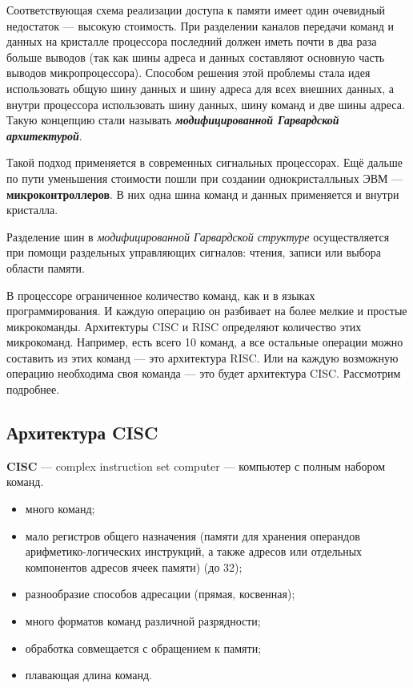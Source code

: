 Соответствующая схема реализации доступа к памяти имеет один очевидный недостаток --- высокую стоимость.
При разделении каналов передачи команд и данных на кристалле процессора последний должен иметь почти в два раза больше выводов (так как шины адреса и данных составляют основную часть выводов микропроцессора).
Способом решения этой проблемы стала идея использовать общую шину данных и шину адреса для всех внешних данных, а внутри процессора использовать шину данных, шину команд и две шины адреса.
Такую концепцию стали называть \textbf{\emph{модифицированной Гарвардской архитектурой}}.

Такой подход применяется в современных сигнальных процессорах.
Ещё дальше по пути уменьшения стоимости пошли при создании однокристалльных ЭВМ --- \textbf{микроконтроллеров}.
В них одна шина команд и данных применяется и внутри кристалла.

Разделение шин в \emph{модифицированной Гарвардской структуре} осуществляется при помощи раздельных управляющих сигналов: чтения, записи или выбора области памяти.

\bigskip
В процессоре ограниченное количество команд, как и в языках программирования.
И каждую операцию он разбивает на более мелкие и простые микрокоманды.
Архитектуры CISC и RISC определяют количество этих микрокоманд.
Например, есть всего 10 команд, а все остальные операции можно составить из этих команд --- это архитектура RISC.
Или на каждую возможную операцию необходима своя команда --- это будет архитектура CISC.
Рассмотрим подробнее.

\subsection{Архитектура CISC}\label{subsec:cisc-architecture}

\textbf{CISC} --- complex instruction set computer --- компьютер с полным набором команд.

\begin{itemize}
    \item много команд;
    \item мало регистров общего назначения (памяти для хранения операндов арифметико-логических инструкций, а также адресов или отдельных компонентов адресов ячеек памяти) (до 32);
    \item разнообразие способов адресации (прямая, косвенная);
    \item много форматов команд различной разрядности;
    \item обработка совмещается с обращением к памяти;
    \item плавающая длина команд.
\end{itemize}

